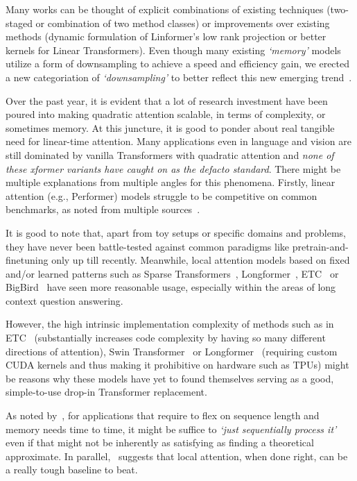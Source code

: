 Many works can be thought of explicit combinations of existing techniques (two-staged or combination of two method classes) or improvements over existing methods (dynamic formulation of Linformer's low rank projection or better kernels for Linear Transformers). Even though many existing \textit{`memory'} models utilize a form of downsampling to achieve a speed and efficiency gain, we erected a new categoriation of \textit{`downsampling'} to better reflect this new emerging trend~\citep{dai2020funnel,jaegle2021perceiver,tay2021charformer,ryoo2021tokenlearner}.

Over the past year, it is evident that a lot of research investment have been poured into making quadratic attention scalable, in terms of complexity, or sometimes memory. At this juncture, it is good to ponder about real tangible need for linear-time attention. Many applications even in language and vision are still dominated by vanilla Transformers with quadratic attention and \emph{none of these xformer variants have caught on as the defacto standard}. There might be multiple explanations from multiple angles for this phenomena. Firstly, linear attention (e.g., Performer) models struggle to be competitive on common benchmarks, as noted from multiple sources~\citep{xiong2021simple,anonymous2021scalinglawmodel}. 

It is good to note that, apart from toy setups or specific domains and problems, they have never been battle-tested against common paradigms like pretrain-and-finetuning only up till recently. Meanwhile, local attention models based on fixed and/or learned patterns such as Sparse Transformers~\citep{child2019generating}, Longformer~\citep{beltagy2020longformer}, ETC~\citep{ainslie2020etc} or BigBird~\citep{zaheer2020big} have seen more reasonable usage, especially within the areas of long context question answering. 

However, the high intrinsic implementation complexity of methods such as in ETC~\citep{ainslie2020etc} (substantially increases code complexity by having so many different directions of attention), Swin Transformer~\citep{liu2021swin} or Longformer~\citep{beltagy2020longformer} (requiring custom CUDA kernels and thus making it prohibitive on hardware such as TPUs) might be reasons why these models have yet to found themselves serving as a good, simple-to-use drop-in Transformer replacement.

As noted by~\citep{rabe2021self}, for applications that require to flex on sequence length and memory needs time to time, it might be suffice to \textit{`just sequentially process it'} even if that might not be inherently as satisfying as finding a theoretical approximate. In parallel,~\citep{xiong2021simple} suggests that local attention, when done right, can be a really tough baseline to beat. 

